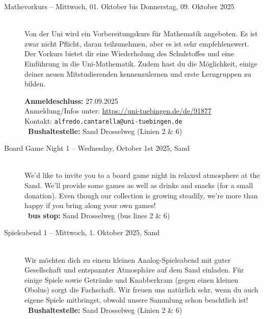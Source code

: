 \begin{description}
\ifbachelor
    \item[Mathevorkurs -- Mittwoch, 01. Oktober bis Donnerstag, 09. Oktober 2025]~\\
    Von der Uni wird ein Vorbereitungskurs für Mathematik angeboten. Es ist zwar nicht Pflicht, daran teilzunehmen, aber es ist sehr empfehlenswert.
    Der Vorkurs bietet dir eine Wiederholung des Schulstoffes und eine Einführung in die Uni-Mathematik. Zudem hast du die Möglichkeit, einige deiner neuen Mitstudierenden kennenzulernen und erste Lerngruppen zu bilden.

    \textbf{Anmeldeschluss:} 27.09.2025\\
    Anmeldung/Infos unter: \url{https://uni-tuebingen.de/de/91877}\\
    Kontakt: \texttt{alfredo.cantarella@uni-tuebingen.de}
    \ifsommersemester
        \\ ~\textbf{Bushaltestelle:} Sand Drosselweg (Linien 2 \& 6)
    \fi
\fi


\ifml
    \item[Board Game Night 1 -- Wednesday, October 1st 2025, Sand]~\\%
    We'd like to invite you to a board game night in relaxed atmosphere at the Sand.
    We'll provide some games as well as drinks and snacks (for a small donation).
    Even though our collection is growing steadily, we're more than happy if you bring along your own games!\\
    ~\textbf{bus stop:} Sand Drosselweg (bus lines 2 \& 6)
\else
    \item[Spieleabend 1 -- Mittwoch, 1. Oktober 2025, Sand]~\\%
    Wir möchten dich zu einem kleinen Analog-Spieleabend mit guter Gesellschaft und entspannter Atmosphäre auf dem Sand einladen.
    Für einige Spiele sowie Getränke und Knabberkram (gegen einen kleinen Obolus) sorgt die Fachschaft.
    Wir freuen uns natürlich sehr, wenn du auch eigene Spiele mitbringst, obwohl unsere Sammlung schon beachtlich ist!\\
    ~\textbf{Bushaltestelle:} Sand Drosselweg (Linien 2 \& 6)
\fi


\end{description}
